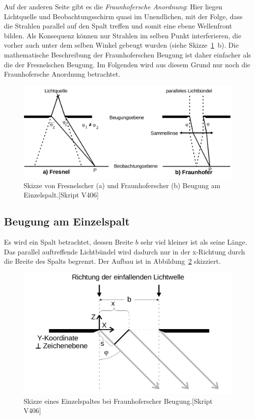 Auf der anderen Seite gibt es die \emph{Fraunhofersche Anordnung}: Hier liegen Lichtquelle und Beobachtungsschirm quasi im Unendlichen, mit der Folge, dass die Strahlen parallel auf den Spalt treffen und somit eine ebene Wellenfront bilden. Als Konsequenz können nur Strahlen im selben Punkt interferieren, die vorher auch unter dem selben Winkel gebeugt wurden (siehe Skizze~\ref{fig:fresnel}~b). Die mathematische Beschreibung der Fraunhoferschen Beugung ist daher einfacher als die der Fresnelschen Beugung. Im Folgenden wird aus diesem Grund nur noch die Fraunhofersche Anordnung betrachtet.

\begin{figure}
  \centering
  \includegraphics[width=0.6\textheight]{../figures/Fresnel.png}
  \caption{Skizze von Fresnelscher (a) und Fraunhoferscher (b) Beugung am Einzelspalt.[Skript V406]}
\label{fig:fresnel}
\end{figure}

\subsection{Beugung am Einzelspalt}
\label{sec:einzel}
Es wird ein Spalt betrachtet, dessen Breite $b$ sehr viel kleiner ist als seine Länge. Das parallel auftreffende Lichtbündel wird dadurch nur in der x-Richtung durch die Breite des Spalts begrenzt. Der Aufbau ist in Abbildung~\ref{fig:spalt} skizziert.

\begin{figure}
  \centering
  \includegraphics[width=0.4\textheight]{../figures/spalt.png}
  \caption{Skizze eines Einzelspaltes bei Fraunhoferscher Beugung.[Skript V406]}
\label{fig:spalt}
\end{figure}

